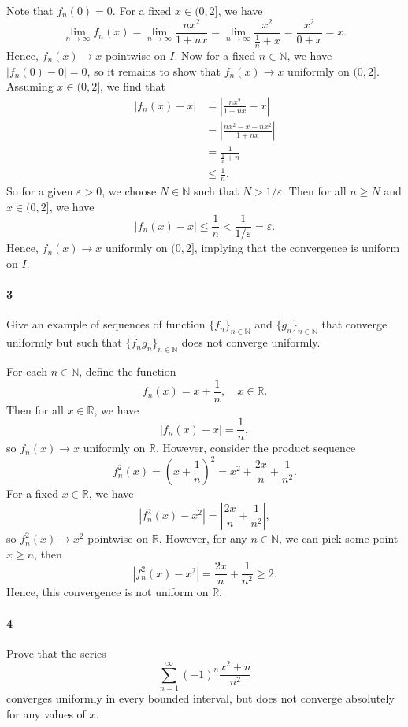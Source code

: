 \documentclass[12pt]{article}
\newenvironment{fullbox}{\begin{lrbox}{\savefullbox}\begin{minipage}{\dimexpr\textwidth-2\fboxsep\relax}}{\end{minipage}\end{lrbox}\begin{center}\framebox[\textwidth]{\usebox{\savefullbox}}\end{center}}
\newenvironment{pbox}[1][]{\begin{fullbox}\ifx#1\empty\else\paragraph{#1}\fi}{\end{fullbox}}
\theoremstyle{definition}
\newcommand{\N}{\mathbb{N}}
\newcommand{\R}{\mathbb{R}}
\newcommand{\eps}{\varepsilon}
\begin{document}
Note that $f_n(0) = 0$. For a fixed $x \in (0, 2]$, we have
\[
    \lim_{n \to \infty} f_n(x)
        = \lim_{n \to \infty} \frac{nx^2}{1+nx}
        = \lim_{n \to \infty} \frac{x^2}{\frac{1}{n}+x}
        = \frac{x^2}{0 + x}
        = x.
\]
Hence, $f_n(x) \to x$ pointwise on $I$. Now for a fixed $n \in \N$, we have $|f_n(0) - 0| = 0$, so it remains to show that $f_n(x) \to x$ uniformly on $(0, 2]$. Assuming $x \in (0, 2]$, we find that
\begin{align*}
    |f_n(x) - x|
        &= \left|\frac{nx^2}{1 + nx} - x\right| \\
        &= \left|\frac{nx^2 - x - nx^2}{1 + nx}\right| \\
        &= \frac{1}{\frac{1}{x} + n} \\
        &\leq \frac{1}{n}.
\end{align*}
So for a given $\eps > 0$, we choose $N \in \N$ such that $N > 1/\eps$. Then for all $n \geq N$ and $x \in (0, 2]$, we have
\[
    |f_n(x) - x| \leq \frac{1}{n} < \frac{1}{1/\eps} = \eps.
\]
Hence, $f_n(x) \to x$ uniformly on $(0, 2]$, implying that the convergence is uniform on $I$.



\newpage
\begin{pbox}[3]
    Give an example of sequences of function $\{f_n\}_{n\in\N}$ and $\{g_n\}_{n\in\N}$ that converge uniformly but such that $\{f_ng_n\}_{n\in\N}$ does not converge uniformly.
\end{pbox}

For each $n \in \N$, define the function
\[
    f_n(x) = x + \frac{1}{n}, \quad x \in \R.
\]
Then for all $x \in \R$, we have
\[
    |f_n(x) - x| = \frac{1}{n},
\]
so $f_n(x) \to x$ uniformly on $\R$. However, consider the product sequence
\[
    f_n^2(x)
        = \left(x + \frac{1}{n}\right)^2
        = x^2 + \frac{2x}{n} + \frac{1}{n^2}.
\]
For a fixed $x \in \R$, we have
\[
    |f_n^2(x) - x^2|
        = \left|\frac{2x}{n} + \frac{1}{n^2}\right|,
\]
so $f_n^2(x) \to x^2$ pointwise on $\R$. However, for any $n \in \N$, we can pick some point $x \geq n$, then
\[
    |f_n^2(x) - x^2|
        = \frac{2x}{n} + \frac{1}{n^2}
        \geq 2.
\]
Hence, this convergence is not uniform on $\R$.




\newpage
\begin{pbox}[4]
    Prove that the series 
    \begin{equation}
    \sum_{n=1}^\infty (-1)^n \frac{x^2+n}{n^2}
    \end{equation}
    converges uniformly in every bounded interval, but does not converge absolutely for any values of $x$. 
\end{pbox}
\end{document}
